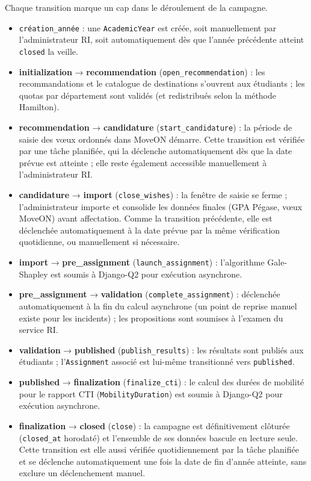 Chaque transition marque un cap dans le déroulement de la campagne.

\begin{itemize}
  \item \texttt{création\_année} : une \texttt{AcademicYear} est créée, soit manuellement par l'administrateur RI, soit automatiquement dès que l'année précédente atteint \texttt{closed} la veille.
  \item \textbf{initialization} → \textbf{recommendation} (\texttt{open\_recommendation}) : les recommandations et le catalogue de destinations s'ouvrent aux étudiants ; les quotas par département sont validés (et redistribués selon la méthode Hamilton).
  \item \textbf{recommendation} → \textbf{candidature} (\texttt{start\_candidature}) : la période de saisie des vœux ordonnés dans MoveON démarre. Cette transition est vérifiée par une tâche planifiée, qui la déclenche automatiquement dès que la date prévue est atteinte ; elle reste également accessible manuellement à l'administrateur RI.
  \item \textbf{candidature} → \textbf{import} (\texttt{close\_wishes}) : la fenêtre de saisie se ferme ; l'administrateur importe et consolide les données finales (GPA Pégase, vœux MoveON) avant affectation. Comme la transition précédente, elle est déclenchée automatiquement à la date prévue par la même vérification quotidienne, ou manuellement si nécessaire.
  \item \textbf{import} → \textbf{pre\_assignment} (\texttt{launch\_assignment}) : l'algorithme Gale-Shapley est soumis à Django-Q2 pour exécution asynchrone.
  \item \textbf{pre\_assignment} → \textbf{validation} (\texttt{complete\_assignment}) : déclenchée automatiquement à la fin du calcul asynchrone (un point de reprise manuel existe pour les incidents) ; les propositions sont soumises à l'examen du service RI.
  \item \textbf{validation} → \textbf{published} (\texttt{publish\_results}) : les résultats sont publiés aux étudiants ; l'\texttt{Assignment} associé est lui-même transitionné vers \texttt{published}.
  \item \textbf{published} → \textbf{finalization} (\texttt{finalize\_cti}) : le calcul des durées de mobilité pour le rapport CTI (\texttt{MobilityDuration}) est soumis à Django-Q2 pour exécution asynchrone.
  \item \textbf{finalization} → \textbf{closed} (\texttt{close}) : la campagne est définitivement clôturée (\texttt{closed\_at} horodaté) et l'ensemble de ses données bascule en lecture seule. Cette transition est elle aussi vérifiée quotidiennement par la tâche planifiée et se déclenche automatiquement une fois la date de fin d'année atteinte, sans exclure un déclenchement manuel.
\end{itemize}

